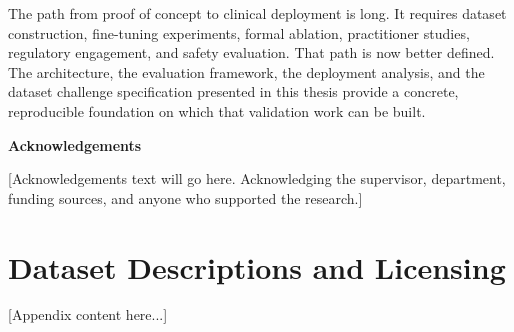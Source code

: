 \documentclass[12pt,a4paper]{report}
\begin{document}
The path from proof of concept to clinical deployment is long. It requires
dataset construction, fine-tuning experiments, formal ablation, practitioner
studies, regulatory engagement, and safety evaluation. That path is now better
defined. The architecture, the evaluation framework, the deployment analysis,
and the dataset challenge specification presented in this thesis provide a
concrete, reproducible foundation on which that validation work can be built.

	
	
	\renewcommand{\bibname}{References}  %
	
	
	
	\clearpage
	\begin{center}
		{\Large \textbf{Acknowledgements}}
	\end{center}
	\vspace{0.5cm}
	
	[Acknowledgements text will go here. Acknowledging the supervisor, department, funding sources, and anyone who supported the research.]
	
	\appendix
	
	\chapter{Dataset Descriptions and Licensing}
	\label{app:datasets}
	[Appendix content here...]
	
	
	
	
\end{document}
